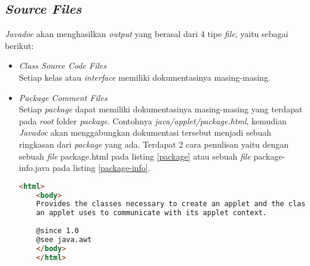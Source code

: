 \subsection{\textit{Source Files}}
\label{sec:source-files}
{\it Javadoc} akan menghasilkan {\it output} yang berasal dari 4 tipe {\it file}, yaitu sebagai berikut:
\begin{itemize}
	\item {\it Class Source Code Files}\\
	Setiap kelas atau {\it interface} memiliki dokumentasinya masing-masing.
	\item {\it Package Comment Files}\\
	Setiap {\it package} dapat memiliki dokumentasinya masing-masing yang terdapat pada {\it root} folder {\it package}. Contohnya {\it java/applet/package.html}, kemudian {\it Javadoc} akan menggabungkan dokumentasi tersebut menjadi sebuah ringkasan dari {\it package} yang ada. 
	Terdapat 2 cara penulisan yaitu dengan sebuah {\it file} package.html pada listing \ref{package} atau sebuah {\it file} package-info.java pada listing \ref{package-info}.
	\begin{lstlisting}[language=Html, caption={\it File package.html}, label={package}]
	<html>
	<body>
	Provides the classes necessary to create an applet and the classes
	an applet uses to communicate with its applet context.
	
	@since 1.0
	@see java.awt
	</body>
	</html>
	\end{lstlisting}
	

\end{itemize}
